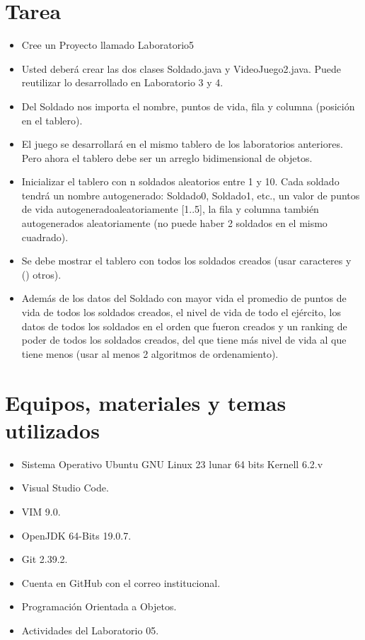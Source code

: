 \documentclass{article}
\begin{document}
	\section{Tarea}
	\begin{itemize}		
        \item Cree un Proyecto llamado Laboratorio5
		\item Usted deberá crear las dos clases Soldado.java y VideoJuego2.java. Puede reutilizar lo desarrollado en Laboratorio 3 y 4.
		\item Del Soldado nos importa el nombre, puntos de vida, fila y columna (posición en el tablero).
		\item El juego se desarrollará en el mismo tablero de los laboratorios anteriores. Pero ahora el tablero debe ser un arreglo bidimensional de objetos.
		\item Inicializar el tablero con n soldados aleatorios entre 1 y 10. Cada soldado tendrá un nombre autogenerado: Soldado0, Soldado1, etc., un valor de puntos de vida autogeneradoaleatoriamente [1..5], la fila y columna también autogenerados aleatoriamente (no puede haber 2 soldados en el mismo cuadrado). 
		\item Se debe mostrar el tablero con todos los soldados creados (usar caracteres y () otros).
		\item Además de los datos del Soldado con mayor vida el promedio de puntos de vida de todos los soldados creados, el nivel de vida de todo el ejército, los datos de todos los soldados en el orden que fueron creados y un ranking de poder de todos los soldados creados, del que tiene más nivel de vida al que tiene menos (usar al menos 2 algoritmos de ordenamiento).
	\end{itemize}

	\section{Equipos, materiales y temas utilizados}
	\begin{itemize}
		\item Sistema Operativo Ubuntu GNU Linux 23 lunar 64 bits Kernell 6.2.v
		\item Visual Studio Code.
		\item VIM 9.0.
		\item OpenJDK 64-Bits 19.0.7.
		\item Git 2.39.2.
		\item Cuenta en GitHub con el correo institucional.
		\item Programación Orientada a Objetos.
		\item Actividades del Laboratorio 05.	
	\end{itemize}
	
\end{document}
